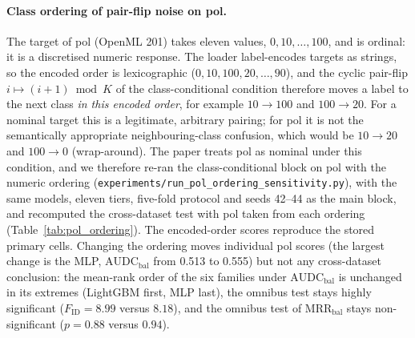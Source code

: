 \documentclass[pdflatex,sn-mathphys]{sn-jnl}
\newcommand{\AUDC}{\mathrm{AUDC}}
\newcommand{\MRR}{\mathrm{MRR}}
\theoremstyle{thmstyleone}
\begin{document}
\paragraph{Class ordering of pair-flip noise on pol.} The target of pol (OpenML 201) takes eleven values, $0, 10, \dots, 100$, and is ordinal: it is a discretised numeric response. The loader label-encodes targets as strings, so the encoded order is lexicographic ($0, 10, 100, 20, \dots, 90$), and the cyclic pair-flip $i \mapsto (i+1) \bmod K$ of the class-conditional condition therefore moves a label to the next class \emph{in this encoded order}, for example $10 \to 100$ and $100 \to 20$. For a nominal target this is a legitimate, arbitrary pairing; for pol it is not the semantically appropriate neighbouring-class confusion, which would be $10 \to 20$ and $100 \to 0$ (wrap-around). The paper treats pol as nominal under this condition, and we therefore re-ran the class-conditional block on pol with the numeric ordering (\texttt{experiments/run\_pol\_ordering\_sensitivity.py}), with the same models, eleven tiers, five-fold protocol and seeds 42--44 as the main block, and recomputed the cross-dataset test with pol taken from each ordering (Table~\ref{tab:pol_ordering}). The encoded-order scores reproduce the stored primary cells. Changing the ordering moves individual pol scores (the largest change is the MLP, $\AUDC_{\mathrm{bal}}$ from 0.513 to 0.555) but not any cross-dataset conclusion: the mean-rank order of the six families under $\AUDC_{\mathrm{bal}}$ is unchanged in its extremes (LightGBM first, MLP last), the omnibus test stays highly significant ($F_{\mathrm{ID}}=8.99$ versus $8.18$), and the omnibus test of $\MRR_{\mathrm{bal}}$ stays non-significant ($p=0.88$ versus $0.94$).
\end{document}
